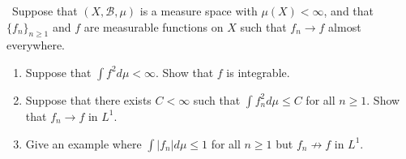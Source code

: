 \documentclass[12pt]{Homework}
\begin{document}
\begin{problem} $\,$
Suppose that $(X,\mathscr{B},\mu)$ is a measure space with $\mu(X)<\infty$, and that $\{f_n\}_{n\ge1}$ and $f$ are measurable functions on $X$ such that $f_n\to f$ almost everywhere.
\begin{enumerate}[label=(\alph*)]
    \item Suppose that $\int f^2d\mu<\infty$. Show that $f$ is integrable.
    \item Suppose that there exists $C<\infty$ such that $\int f_n^2d\mu\le C$ for all $n\ge1$. Show that $f_n\to f$ in $L^1$.
    \item Give an example where $\int|f_n|d\mu\le 1$ for all $n\ge 1$ but $f_n\not\to f$ in $L^1$.
\end{enumerate}
\end{problem}
\end{document}
